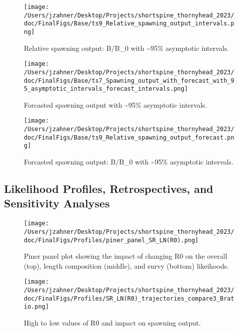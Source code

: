 \documentclass[11pt,
  english,
  letterpaper,
]{article}
\begin{document}
\begin{figure}
\centering
\texttt{[image: /Users/jzahner/Desktop/Projects/shortspine\_thornyhead\_2023/doc/FinalFigs/Base/ts9\_Relative\_spawning\_output\_intervals.png]}
\caption{Relative spawning output: B/B\_0 with \textasciitilde95\% asymptotic intervals.\label{fig:relspawnout}}
\end{figure}

\begin{figure}
\centering
\texttt{[image: /Users/jzahner/Desktop/Projects/shortspine\_thornyhead\_2023/doc/FinalFigs/Base/ts7\_Spawning\_output\_with\_forecast\_with\_95\_asymptotic\_intervals\_forecast\_intervals.png]}
\caption{Forcasted spawning output with \textasciitilde95\% asymptotic intervals.\label{fig:spawnnout_forcast}}
\end{figure}

\begin{figure}
\centering
\texttt{[image: /Users/jzahner/Desktop/Projects/shortspine\_thornyhead\_2023/doc/FinalFigs/Base/ts9\_Relative\_spawning\_output\_forecast.png]}
\caption{Forcasted spawning output: B/B\_0 with \textasciitilde95\% asymptotic intervals.\label{fig:relspawnout_forcast}}
\end{figure}

\clearpage

\hypertarget{likelihood-profiles-retrospectives-and-sensitivity-analyses}{%
\subsection{Likelihood Profiles, Retrospectives, and Sensitivity Analyses}\label{likelihood-profiles-retrospectives-and-sensitivity-analyses}}

\begin{figure}
\centering
\texttt{[image: /Users/jzahner/Desktop/Projects/shortspine\_thornyhead\_2023/doc/FinalFigs/Profiles/piner\_panel\_SR\_LN(R0).png]}
\caption{Piner panel plot showing the impact of changing R0 on the overall (top), length composition (middle), and survy (bottom) likeihoods.\label{fig:R0_prof}}
\end{figure}

\begin{figure}
\centering
\texttt{[image: /Users/jzahner/Desktop/Projects/shortspine\_thornyhead\_2023/doc/FinalFigs/Profiles/SR\_LN(R0)\_trajectories\_compare3\_Bratio.png]}
\caption{High to low values of R0 and impact on spawning output.\label{fig:R0_spawnout}}
\end{figure}
\end{document}
